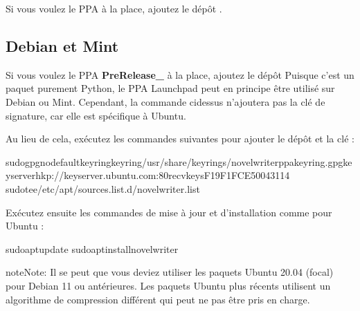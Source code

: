 \documentclass[a4paper,11pt,french]{sphinxmanual}
\begin{document}
\sphinxAtStartPar
Si vous voulez le PPA  à la place, ajoutez le dépôt .


\subsection{Debian et Mint}
\label{\detokenize{int_started:debian-and-mint}}
\sphinxAtStartPar
Si vous voulez le PPA {\color{red}\bfseries{}\textasciigrave{}Pre\sphinxhyphen{}Release\textasciigrave{}\_} à la place, ajoutez le dépôt  Puisque c’est un paquet purement Python, le PPA Launchpad peut en principe être utilisé sur Debian ou Mint. Cependant, la commande ci\sphinxhyphen{}dessus n’ajoutera pas la clé de signature, car elle est spécifique à Ubuntu.

\sphinxAtStartPar
Au lieu de cela, exécutez les commandes suivantes pour ajouter le dépôt et la clé :

\begin{sphinxVerbatim}[commandchars=\\\{\}]
sudogpg\PYGZhy{}\PYGZhy{}no\PYGZhy{}default\PYGZhy{}keyring\PYGZhy{}\PYGZhy{}keyring/usr/share/keyrings/novelwriter\PYGZhy{}ppa\PYGZhy{}keyring.gpg\PYGZhy{}\PYGZhy{}keyserverhkp://keyserver.ubuntu.com:80\PYGZhy{}\PYGZhy{}recv\PYGZhy{}keysF19F1FCE50043114
sudotee/etc/apt/sources.list.d/novelwriter.list
\end{sphinxVerbatim}

\sphinxAtStartPar
Exécutez ensuite les commandes de mise à jour et d’installation comme pour Ubuntu :

\begin{sphinxVerbatim}[commandchars=\\\{\}]
sudoaptupdate
sudoaptinstallnovelwriter
\end{sphinxVerbatim}

\begin{sphinxadmonition}{note}{Note:}
\sphinxAtStartPar
Il se peut que vous deviez utiliser les paquets Ubuntu 20.04 (focal) pour Debian 11 ou antérieures. Les paquets Ubuntu plus récents utilisent un algorithme de compression différent qui peut ne pas être pris en charge.
\end{sphinxadmonition}
\end{document}
